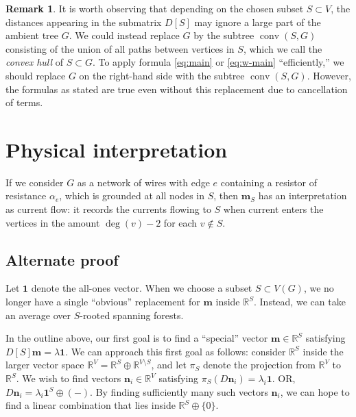 \documentclass{amsart}
\theoremstyle{definition}
\newtheorem{rmk}[thm]{Remark}
\newcommand{\RR}{\mathbb{R}}
\newcommand{\boldm}{\mathbf{m}}
\DeclareMathOperator{\conv}{conv}
\begin{document}
\begin{rmk}
It is worth observing that depending on the chosen subset $S \subset V$, the distances appearing in the submatrix $D[S]$ may ignore a large part of the ambient tree $G$.
We could instead replace $G$ by the subtree  $\conv(S,G)$ consisting of the union of all paths between vertices in $S$,
which we call the {\em convex hull} of $S \subset G$.
To apply formula \eqref{eq:main} or \eqref{eq:w-main} ``efficiently,''
we should replace $G$ on the right-hand side with the subtree $\conv(S,G)$.
However, the formulas as stated are true even without this replacement due to cancellation of terms.
\end{rmk}

\section{Physical interpretation}

If we consider $G$ as a network of wires with edge $e$ containing a resistor of resistance $\alpha_e$,
which is grounded at all nodes in $S$,
then $\boldm_S$ has an interpretation as current flow: 
it records the currents flowing to $S$
when current enters the vertices in the amount $\deg(v) - 2$
for each $v\not\in S$.

\subsection{Alternate proof}

Let $\mathbf{1}$ denote the all-ones vector.
When we choose a subset $S \subset V(G)$, we no longer have a single ``obvious'' replacement for $\boldm$ inside $\RR^S$.
Instead, we can take an average over $S$-rooted spanning forests.

In the outline above, our first goal is to find a ``special'' vector $ \boldm\in \RR^S$ satisfying $D[S] \boldm = \lambda \mathbf{1}$.
We can approach this first goal as follows: 
consider $\RR^S$ inside the larger vector space $\RR^V = \RR^S \oplus \RR^{V\setminus S}$,
and let $\pi_S$ denote the projection from $\RR^V$ to $\RR^S$.
We wish to find vectors $\mathbf{n}_i \in \RR^{V}$ satisfying
$\pi_S( D \mathbf{n}_i) = \lambda_i \mathbf{1}$.
OR, $D \mathbf{n}_i = \lambda_i \mathbf{1}^S \oplus (-)$.
By finding sufficiently many such vectors $\mathbf{n}_i$,
we can hope to find a linear combination that lies inside $\RR^S \oplus \{0\}$.
\end{document}

